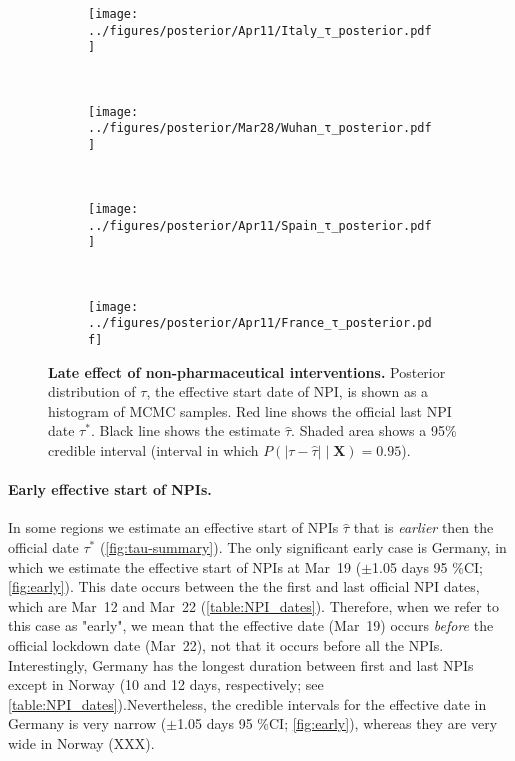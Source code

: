 \documentclass[12pt]{extarticle}
\let\vec\mathbf
\begin{document}
\begin{figure}[h]
    \centering
    \begin{subfigure}{0.45\textwidth}
        \texttt{[image: ../figures/posterior/Apr11/Italy\_τ\_posterior.pdf]}
    \end{subfigure}
  	~
    \begin{subfigure}{0.45\textwidth}
        \texttt{[image: ../figures/posterior/Mar28/Wuhan\_τ\_posterior.pdf]}
    \end{subfigure}
    \\
    \begin{subfigure}{0.45\textwidth}
        \texttt{[image: ../figures/posterior/Apr11/Spain\_τ\_posterior.pdf]}
    \end{subfigure}
    ~
    \begin{subfigure}{0.45\textwidth}
		\texttt{[image: ../figures/posterior/Apr11/France\_τ\_posterior.pdf]}
    \end{subfigure}
    \caption{
	\textbf{Late effect of non-pharmaceutical interventions.}
    Posterior distribution of $\tau$, the effective start date of NPI, is shown as a histogram of MCMC samples. Red line shows the official last NPI date $\tau^*$. Black line shows the estimate $\hat{\tau}$. Shaded area shows a 95\% credible interval (interval in which $P(|\tau - \hat{\tau}| \mid \vec{X}) = 0.95$). 
    }
    \label{fig:late}
\end{figure}



\paragraph*{Early effective start of NPIs.}
In some regions we estimate an effective start of NPIs $\hat{\tau}$ that is \emph{earlier} then the official date $\tau^*$ (\autoref{fig:tau-summary}).
The only significant early case is Germany, in which we estimate the effective start of NPIs at Mar~19 ($\pm$1.05 days 95 \%CI; \autoref{fig:early}).
This date occurs between the the first and last official NPI dates, which are Mar~12 and Mar~22 (\autoref{table:NPI_dates}). Therefore, when we refer to this case as "early", we mean that the effective date (Mar~19) occurs \emph{before} the official lockdown date (Mar~22), not that it occurs before all the NPIs.
Interestingly, Germany has the longest duration between first and last NPIs except in Norway (10 and 12 days, respectively; see \autoref{table:NPI_dates}).Nevertheless, the credible intervals for the effective date in Germany is very narrow ($\pm$1.05 days 95 \%CI; \autoref{fig:early}), whereas they are very wide in Norway (XXX).
\end{document}
